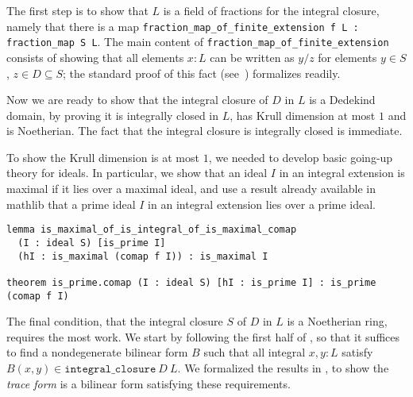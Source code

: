 \documentclass[a4paper,USenglish,cleveref, autoref, thm-restate]{lipics-v2021}
\newcommand{\lean}[1]{\texttt{#1}\xspace} %
\newcommand{\mathlib}{\textsf{mathlib}\xspace}
\begin{document}
The first step is to show that $L$ is a field of fractions for the integral closure, namely that there is a map \lean{fraction\_map\_of\_finite\_extension f L : fraction\_map S L}.
The main content of \lean{fraction\_map\_of\_finite\_extension} consists of showing that all elements $x : L$ can be written as $y / z$ for elements $y \in S$, $z \in D \subseteq S$;
the standard proof of this fact (see~\cite[Theorem~15.29]{Dummit-and-Foote}) formalizes readily.

Now we are ready to show that the integral closure of $D$ in $L$ is a Dedekind domain,
by proving it is integrally closed in $L$, has Krull dimension at most $1$ and is Noetherian.
The fact that the integral closure is integrally closed is immediate.

To show the Krull dimension is at most $1$, we needed to develop basic going-up theory for ideals.
In particular, we show that an ideal $I$ in an integral extension is maximal if it lies over a maximal ideal,
and use a result already available in \mathlib that a prime ideal $I$ in an integral extension lies over a prime ideal.
\begin{lstlisting}
lemma is_maximal_of_is_integral_of_is_maximal_comap
  (I : ideal S) [is_prime I]
  (hI : is_maximal (comap f I)) : is_maximal I

theorem is_prime.comap (I : ideal S) [hI : is_prime I] : is_prime (comap f I)
\end{lstlisting}

The final condition, that the integral closure $S$ of $D$ in $L$ is a Noetherian ring, requires the most work.
We start by following the first half of \cite[Theorem~15.29]{Dummit-and-Foote},
so that it suffices to find a nondegenerate bilinear form $B$ such that all integral $x, y : L$ satisfy $B(x, y) \in \lean{integral\_closure}\ D\ L$.
We formalized the results in \cite[\S\S~2.5--2.8]{Neukirch}, to show the \emph{trace form} is a bilinear form satisfying these requirements.
\end{document}
